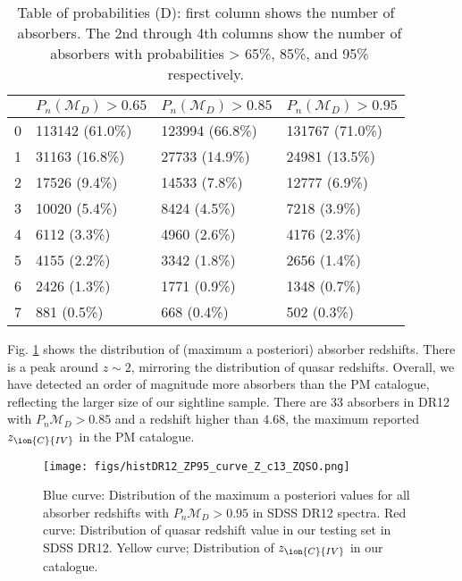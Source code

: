 \documentclass[fleqn,usenatbib]{mnras}
\newcommand{\civ}{\ion{C}{IV}}
\newcommand{\zciv}{z_{\civ}}
\newcommand{\model}{\mathcal{M}}
\newcommand{\spb}[1]{\textcolor{red}{[\bf SPB: #1]}}
\begin{document}
\begin{table}
  \caption{Table of probabilities (D): first column shows the number of \civ\ absorbers. The 2nd through 4th
   columns   show the number of \civ~absorbers with probabilities > 65\%, 85\%, and 95\% respectively. } %
  \label{tab:p_c4}
    \begin{tabular}{|l|l|l|l|}
    \hline
    \civ &	$P_n(\model_D)>0.65$ &	$P_n(\model_D)>0.85$&	$P_n(\model_D)>0.95$\\ \hline
    0 &	113142 (61.0\%)&	123994 (66.8\%)&	131767 (71.0\%)\\
    1	& 31163	(16.8\%)& 27733	(14.9\%) & 24981 (13.5\%)\\
    2	& 17526 (9.4\%)&	14533 (7.8\%)	& 12777 (6.9\%)\\
    3	& 10020	(5.4\%)& 8424 (4.5\%)&	7218 (3.9\%)\\
    4&	6112 (3.3\%)&	4960 (2.6\%)&	4176 (2.3\%)\\
    5	& 4155 (2.2\%)	& 3342	(1.8\%)& 2656 (1.4\%)\\
    6&	2426	(1.3\%) & 1771 (0.9\%)&	1348 (0.7\%)\\
    7& 881 (0.5\%)& 668 (0.4\%) & 502 (0.3\%)\\
      \end{tabular}
\end{table}

Fig. \ref{fig:DR12Z} shows the distribution of (maximum a posteriori) absorber redshifts.
There is a peak around $z\sim 2$, mirroring the distribution of quasar 
redshifts. Overall, we have detected an order of magnitude more absorbers 
than the PM catalogue, reflecting the larger size of our sightline sample.
There are $33$ absorbers in DR12 with  $P_n{\model_D}>0.85$
and a redshift higher than $4.68$, the maximum reported
$\zciv$ in the PM catalogue.

\begin{figure}
\texttt{[image: figs/histDR12\_ZP95\_curve\_Z\_c13\_ZQSO.png]}
\caption{Blue curve: Distribution of the maximum a posteriori values for all absorber redshifts
with $P_n{\model_D}>0.95$ in SDSS DR12 spectra. Red curve: Distribution of quasar redshift value in
our testing set in SDSS DR12. Yellow curve; Distribution of $\zciv$ in our catalogue. }
\label{fig:DR12Z}
\end{figure}
\end{document}
